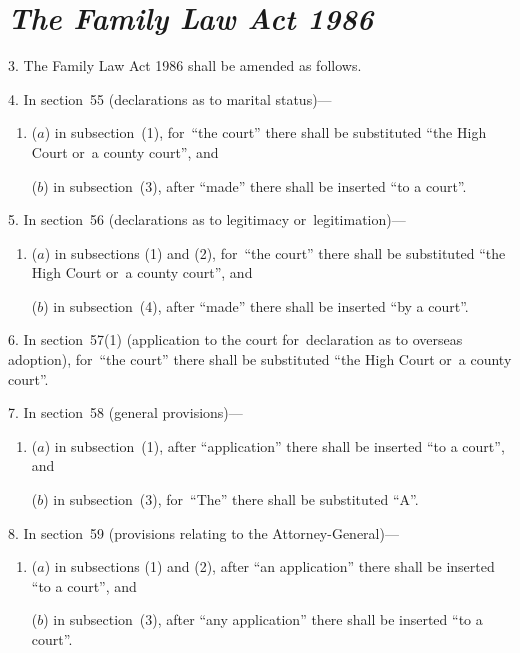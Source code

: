 \documentclass[12pt,a4paper]{article}
\begin{document}

\section*{\itshape The Family Law Act 1986}

3. The Family Law Act 1986 shall be amended as follows.

\medskip

4. In section~55 (declarations as to marital status)—
\begin{enumerate}\item[]
($a$) in subsection~(1), for~“the court” there shall be substituted “the High Court or~a county court”, and

($b$) in subsection~(3), after “made” there shall be inserted “to a court”.
\end{enumerate}

\medskip

5. In section~56 (declarations as to legitimacy or~legitimation)—
\begin{enumerate}\item[]
($a$) in subsections (1)  and (2), for~“the court” there shall be substituted “the High Court or~a county court”, and

($b$) in subsection~(4), after “made” there shall be inserted “by a court”.
\end{enumerate}

\medskip

6. In section~57(1)  (application to the court for~declaration as to overseas adoption), for~“the court” there shall be substituted “the High Court or~a county court”.

\medskip

7. In section~58 (general provisions)—
\begin{enumerate}\item[]
($a$) in subsection~(1), after “application” there shall be inserted “to a court”, and

($b$) in subsection~(3), for~“The” there shall be substituted “A”.
\end{enumerate}

\medskip

8. In section~59 (provisions relating to the Attorney-General)—
\begin{enumerate}\item[]
($a$) in subsections (1)  and (2), after “an application” there shall be inserted “to a court”, and

($b$) in subsection~(3), after “any application” there shall be inserted “to a court”.
\end{enumerate}
\end{document}
